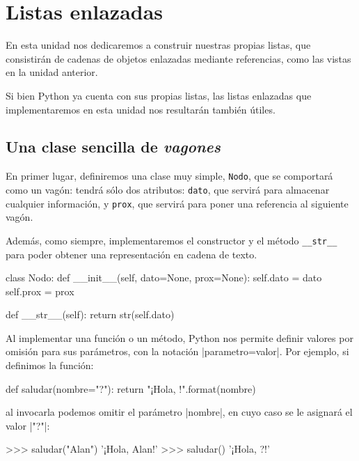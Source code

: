 \chapter{Listas enlazadas}

En esta unidad nos dedicaremos a construir nuestras propias listas, que
consistirán de cadenas de objetos enlazadas mediante referencias, como las
vistas en la unidad anterior.

Si bien Python ya cuenta con sus propias listas, las listas enlazadas que
implementaremos en esta unidad nos resultarán también útiles.

\section{Una clase sencilla de {\it vagones}}

En primer lugar, definiremos una clase muy simple, \lstinline!Nodo!, que se
comportará como un vagón: tendrá sólo dos atributos: \lstinline!dato!, que
servirá para almacenar cualquier información, y \lstinline!prox!, que servirá
para poner una referencia al siguiente vagón.

Además, como siempre, implementaremos el constructor y el método
\lstinline!__str__! para poder obtener una representación en cadena de texto.

\begin{codigo-python-sn}
class Nodo:
    def __init__(self, dato=None, prox=None):
        self.dato = dato
        self.prox = prox

    def __str__(self):
        return str(self.dato)
\end{codigo-python-sn}

\begin{sabias_que}
Al implementar una función o un método, Python nos permite definir valores por
omisión para sus parámetros, con la notación |parametro=valor|. Por ejemplo, si
definimos la función:

\begin{codigo-python-sn}
def saludar(nombre="?"):
    return "¡Hola, {}!".format(nombre)
\end{codigo-python-sn}

\noindent al invocarla podemos omitir el parámetro |nombre|, en cuyo caso se le
asignará el valor |"?"|:

\begin{codigo-python-sn}
>>> saludar("Alan")
'¡Hola, Alan!'
>>> saludar()
'¡Hola, ?!'
\end{codigo-python-sn}
\end{sabias_que}

